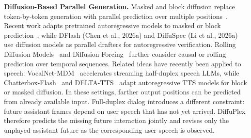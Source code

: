 \textbf{Diffusion-Based Parallel Generation.}
Masked and block diffusion replace token-by-token generation with parallel prediction over multiple positions~\citep{NEURIPS2021_958c5305,pmlr-v235-lou24a,NEURIPS2024_eb0b13cc,ICLR2025_7ede97c3}.
Recent work adapts pretrained autoregressive models to masked or block prediction~\citep{ICLR2025_0fa81c3f,cheng-etal-2026-sdar,ICLR2026_d0865cbe,gat2025setblockdecodinglanguage,samragh2025llmknowsfutureuncovering},
while DFlash (Chen et al., 2026a) and DiffuSpec (Li et al., 2026a) use diffusion models as parallel
drafters for autoregressive verification.
Rolling Diffusion Models~\citep{pmlr-v235-ruhe24a} and Diffusion Forcing~\citep{NEURIPS2024_2aee1c41} further consider causal or rolling prediction over temporal sequences.
Related ideas have recently been applied to speech: VocalNet-MDM~\citep{cheng2026vocalnetmdmacceleratingstreamingspeech} accelerates streaming half-duplex speech LLMs, while Chatterbox-Flash~\citep{seo2026chatterboxflashpriorcalibratedblockdiffusion} and DELTA-TTS~\citep{moon2026deltattsadaptingautoregressivemodel} adapt autoregressive TTS models for block or masked diffusion.
In these settings, farther output positions can be predicted from already available input.
Full-duplex dialog introduces a different constraint: future assistant frames depend on user speech that has not yet arrived.
DiffuPlex therefore predicts the missing future interaction jointly and revises only the unplayed assistant future as the corresponding user speech is observed.

